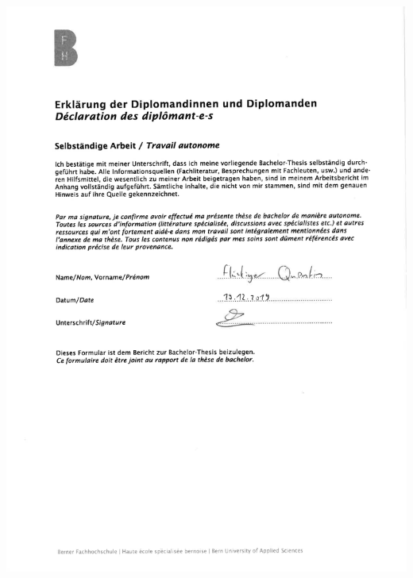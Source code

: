 \documentclass{scrreprt}
\begin{document}
\includegraphics[width=\textwidth]{pdf/Declaration_of_authonomy.pdf}

\printbibliography[heading=bibintoc]
\end{document}
